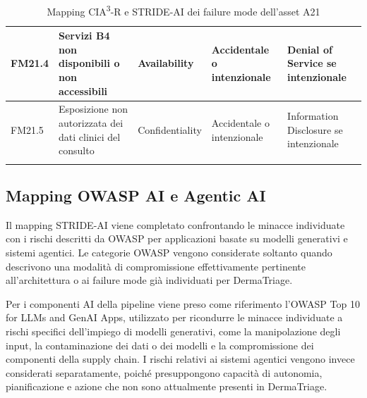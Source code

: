 {\begin{xltabular}{\textwidth}{
    >{\raggedright\arraybackslash}p{1.35cm}
    X
    >{\raggedright\arraybackslash}p{3.5cm}
    >{\raggedright\arraybackslash}p{2.7cm}
    >{\raggedright\arraybackslash}p{2.4cm}
}
\midrule

FM21.4 &

Servizi B4 non disponibili o non accessibili &

Availability &

Accidentale o intenzionale &

Denial of Service se intenzionale \\

\midrule

FM21.5 &

Esposizione non autorizzata dei dati clinici del consulto &

Confidentiality &

Accidentale o intenzionale &

Information Disclosure se intenzionale \\

\bottomrule

\caption{Mapping CIA\textsuperscript{3}-R e STRIDE-AI dei failure mode dell'asset A21}

\label{tab:a21-stride}\\

\end{xltabular}
}

\subsection{Mapping OWASP AI e Agentic AI}
Il mapping STRIDE-AI viene completato confrontando le minacce individuate con i
rischi descritti da OWASP per applicazioni basate su modelli generativi e sistemi
agentici. Le categorie OWASP vengono considerate soltanto quando descrivono una
modalità di compromissione effettivamente pertinente all'architettura o ai failure
mode già individuati per DermaTriage.

Per i componenti AI della pipeline viene preso come riferimento l'OWASP Top 10 for
LLMs and GenAI Apps, utilizzato per ricondurre le minacce individuate a rischi
specifici dell'impiego di modelli generativi, come la manipolazione degli input,
la contaminazione dei dati o dei modelli e la compromissione dei componenti della
supply chain. I rischi relativi ai sistemi agentici vengono invece considerati
separatamente, poiché presuppongono capacità di autonomia, pianificazione e azione
che non sono attualmente presenti in DermaTriage.


